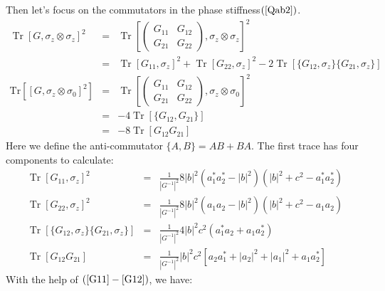 \documentclass{article}
\newcommand{\tmop}[1]{\ensuremath{\operatorname{#1}}}
\begin{document}
Then let's focus on the commutators in the phase stiffness$\left( \ref{Qab2}
\right)$.
\begin{eqnarray}
  \tmop{Tr} [G, \sigma_z \otimes \sigma_z]^2 & = & \tmop{Tr} \left[
  \left(\begin{array}{cc}
    G_{11} & G_{12}\\
    G_{21} & G_{22}
  \end{array}\right), \sigma_z \otimes \sigma_z \right]^2 \nonumber\\
  & = & \tmop{Tr} [G_{11}, \sigma_z]^2 + \tmop{Tr} [G_{22}, \sigma_z]^2 - 2
  \tmop{Tr} [\{ G_{12}, \sigma_z \} \{ G_{21}, \sigma_z \}] \\
  \text{Tr} [[G, \sigma_z \otimes \sigma_0]^2] & = & \tmop{Tr} \left[
  \left(\begin{array}{cc}
    G_{11} & G_{12}\\
    G_{21} & G_{22}
  \end{array}\right), \sigma_z \otimes \sigma_0 \right]^2 \nonumber\\
  & = & - 4 \tmop{Tr} [\{ G_{12}, G_{21} \}] \nonumber\\
  & = & - 8 \tmop{Tr} [G_{12} G_{21}] 
\end{eqnarray}
Here we define the anti-commutator $\{ A, B \} = A B + B A$. The first trace
has four components to calculate:
\begin{eqnarray}
  \tmop{Tr} [G_{11}, \sigma_z]^2 & = & \frac{1}{| G^{- 1} |^2} 8 | b |^2
  (a_1^{\ast} a_2^{\ast} - | b |^2) (| b |^2 + c^2 - a_1^{\ast} a_2^{\ast})
  \label{G11} \\
  \tmop{Tr} [G_{22}, \sigma_z]^2 & = & \frac{1}{| G^{- 1} |^2} 8 | b |^2 (a_1
  a_2 - | b |^2) (| b |^2 + c^2 - a_1 a_2) \\
  \tmop{Tr} [\{ G_{12}, \sigma_z \} \{ G_{21}, \sigma_z \}] & = & \frac{1}{|
  G^{- 1} |^2} 4 | b |^2 c^2 (a_1^{\ast} a_2 + a_1 a_2^{\ast}) \\
  \tmop{Tr} [G_{12} G_{21}] & = & \frac{1}{| G^{- 1} |^2} | b |^2 c^2 [a_2
  a_1^{\ast} + | a_2 |^2 + | a_1 |^2 + a_1 a_2^{\ast}] \label{G12} 
\end{eqnarray}
With the help of $\left( \ref{G11} - \ref{G12} \right)$, we have:
\end{document}
